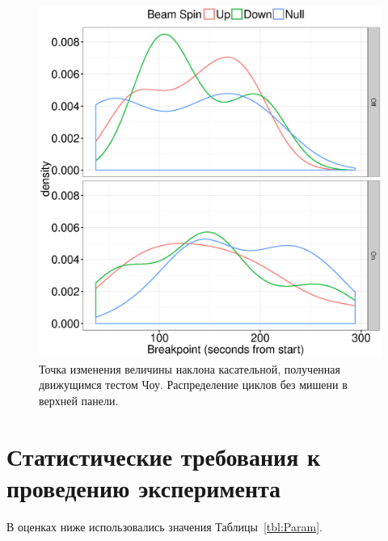 \documentclass{article}
\begin{document}
	\begin{figure}[h]
		\centering
		\includegraphics[scale=.8]{img/FStats_BP_dens.eps}
		\caption{Точка изменения величины наклона касательной, полученная движущимся тестом Чоу. Распределение циклов без мишени в верхней панели.\label{fig:FStat_BP_dens}}
	\end{figure}

	\section{Статистические требования к проведению эксперимента}\label{sec:StatReq}
	\newcommand{\Dim}[1]{\mathrm{#1}}
	\newcommand{\Tint}{\Delta t}
	\newcommand{\err}{\epsilon}
	\newcommand{\DP}{\Delta P}
	
	В оценках ниже использовались значения Таблицы~\ref{tbl:Param}.
\end{document}
